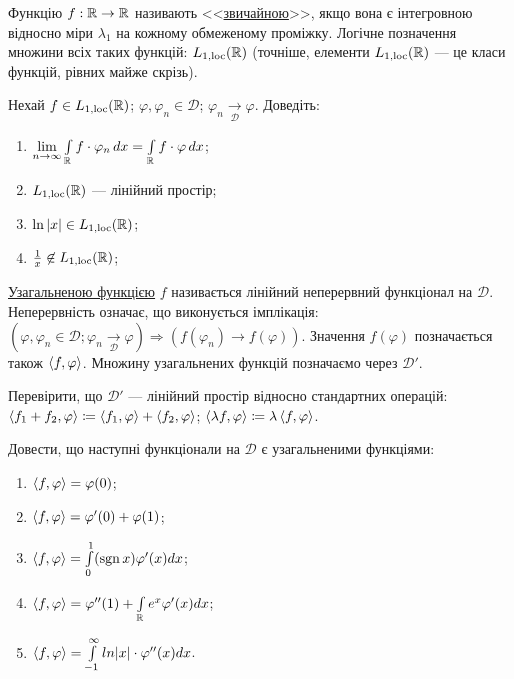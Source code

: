 \begin{theory}
    Функцію $f: \mathbb{R} \to \mathbb{R}$ називають <<\ul{звичайною}>>, якщо вона є інтегровною
    відносно міри $\lambda_1$ на кожному обмеженому проміжку. Логічне позначення множини
    всіх таких функцій: $L_{1,\mathrm{loc}}(\mathbb{R})$ (точніше, елементи $L_{1,\mathrm{loc}}(\mathbb{R})$
    --- це класи функцій, рівних майже скрізь).
\end{theory}

\begin{exercise}
    Нехай $f \in L_{1,\mathrm{loc}}(\mathbb{R})$; $\varphi, \varphi_n \in \mathcal{D}$;
    $\varphi_n \underset{\mathcal{D}}{\to} \varphi$. Доведіть:
    \begin{enumerate}
        \item $\lim\limits_{n\to\infty} \int\limits_{\mathbb{R}}^{} f\cdot \varphi_n \,dx
              = \int\limits_{\mathbb{R}}^{} f\cdot \varphi \,dx$;
        \item $L_{1,\mathrm{loc}}(\mathbb{R})$ --- лінійний простір;
        \item $\ln|x| \in L_{1,\mathrm{loc}}(\mathbb{R})$;
        \item $\frac{1}{x} \not\in L_{1,\mathrm{loc}}(\mathbb{R})$;
    \end{enumerate}
\end{exercise}

\begin{theory}
    \ul{Узагальненою функцією} $f$ називається лінійний неперервний функціонал на $\mathcal{D}$.
    Неперервність означає, що виконується імплікація: $(\varphi, \varphi_n \in \mathcal{D};
    \varphi_n \underset{\mathcal{D}}{\to} \varphi)  \Rightarrow (f(\varphi_n) \to f(\varphi))$.
    Значення $f(\varphi)$ позначається також $\left\langle f, \varphi\right\rangle$. Множину узагальнених
    функцій позначаємо через $\mathcal{D}'$.
\end{theory}

\begin{exercise}
    Перевірити, що $\mathcal{D}'$ --- лінійний простір відносно стандартних операцій:
    $\left\langle f_1 + f_2, \varphi\right\rangle \coloneqq \left\langle f_1, \varphi\right\rangle + \left\langle f_2, \varphi\right\rangle$;
    $\left\langle\lambda f, \varphi\right\rangle \coloneqq \lambda \left\langle f, \varphi\right\rangle$.
\end{exercise}

\begin{exercise}
    Довести, що наступні функціонали на $\mathcal{D}$ є узагальненими функціями:
    \begin{enumerate}
        \item $\left\langle f, \varphi\right\rangle = \varphi(0)$;
        \item $\left\langle f, \varphi\right\rangle = \varphi'(0) + \varphi(1)$;
        \item $\left\langle f, \varphi\right\rangle = \int\limits_{0}^{1} (\operatorname{sgn} x) \varphi'(x) dx$;
        \item $\left\langle f, \varphi\right\rangle = \varphi''(1) + \int\limits_{\mathbb{R}}^{} e^x \varphi'(x) dx$;
        \item $\left\langle f, \varphi\right\rangle = \int\limits_{-1}^{\infty} ln|x| \cdot \varphi''(x) dx$.
    \end{enumerate}
\end{exercise}

